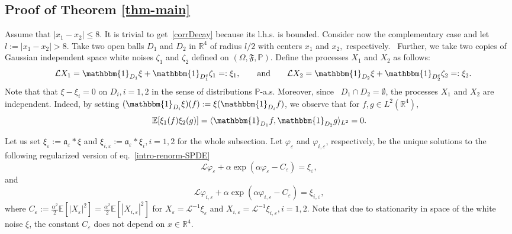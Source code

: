 \documentclass{article}
\newcommand{\assign}{:=}
\newcommand{\backassign}{=:}
\newcommand{\tmop}[1]{\ensuremath{\operatorname{#1}}}
\begin{document}
\subsection{Proof of Theorem \ref{thm-main}}\label{subsec-coupling-proof}

\qquad Assume that $| x_1 - x_2 | \leqslant 8.$ It is trivial to
get~\eqref{corrDecay} because its l.h.s. is bounded. Consider now the
complementary case and let $l \assign | x_1 - x_2 | > 8$. Take two open balls
$D_1$ and $D_2$ in $\mathbb{R}^4$ of radius $l / 2$ with centers $x_1$ and
$x_2,$ respectively. \ Further, we take two copies of Gaussian independent
space white noises $\zeta_1$ and $\zeta_2$ defined on $(\Omega, \mathfrak{F},
\mathbb{P})$. Define the processes $X_1$ and $X_2$ as follows:
\begin{equation}
  \quad \begin{array}{l}
    \mathcal{L}X_1 =\mathbbm{1}_{D_1} \xi +\mathbbm{1}_{D_1^c} \zeta_1
    \backassign \xi_1, \qquad \textrm{\tmop{and}} \qquad \mathcal{L}X_2
    =\mathbbm{1}_{D_2} \xi +\mathbbm{1}_{D_2^c} \zeta_2 \backassign \xi_2 .
    \label{OU}
  \end{array}
\end{equation}
Note that that $\xi - \xi_i = 0$ on $D_i, i = 1, 2$ in the sense of
distributions $\mathbb{P}$-a.s. Moreover, since \ $D_1 \cap D_2 = \emptyset$,
the processes $X_1$ and $X_2$ are independent. Indeed, by setting
$(\mathbbm{1}_{D_i} \xi) (f) \assign \xi (\mathbbm{1}_{D_i} f)$, we observe
that for $f, g \in L^2 (\mathbb{R}^4),$
\[ \mathbb{E} [\xi_1 (f) \xi_2 (g)] = \langle \mathbbm{1}_{D_1} f,
   \mathbbm{1}_{D_2} g \rangle_{L^2} = 0. \]


Let us set $\xi_{\varepsilon} \assign \mathfrak{a}_{\varepsilon} \ast \xi$ and
$\xi_{i, \varepsilon} \assign \mathfrak{a}_{\varepsilon} \ast \xi_i, i = 1, 2$
for the whole subsection. Let $\varphi_{\varepsilon}$ and $\varphi_{i,
\varepsilon}$, respectively, be the unique solutions to the following
regularized version of eq.~\eqref{intro-renorm-SPDE}
\begin{equation}\label{b-approxSPDE}
    \mathcal{L} \varphi_{\varepsilon} + \alpha \exp (\alpha
    \varphi_{\varepsilon} - C_{\varepsilon}) = \xi_{\varepsilon}, 
\end{equation}
and
\begin{equation}\label{b-approxSPDE-1}
    \mathcal{L} \varphi_{i, \varepsilon} + \alpha \exp (\alpha \varphi_{i,
    \varepsilon} - C_{\varepsilon}) = \xi_{i, \varepsilon},
\end{equation}
where $C_{\varepsilon} \assign \frac{\alpha^2}{2} \mathbb{E} [|
X_{\varepsilon} |^2] = \frac{\alpha^2}{2} \mathbb{E} [| X_{i, \varepsilon}
|^2] $ for $X_{\varepsilon} =\mathcal{L}^{- 1} \xi_{\varepsilon}$ and $X_{i,
\varepsilon} =\mathcal{L}^{- 1} \xi_{i, \varepsilon}, i = 1, 2$. Note that due
to stationarity in space of the white noise $\xi$, the constant
$C_{\varepsilon}$ does not depend on $x \in \mathbb{R}^4$.
\end{document}
